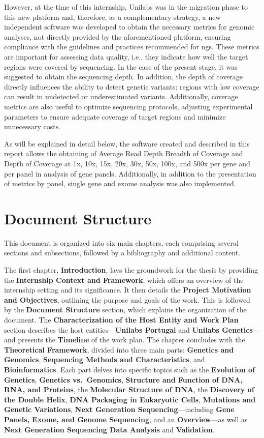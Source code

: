 However, at the time of this internship, Unilabs was in the migration phase to this new platform and, therefore, as a complementary strategy, a new independent software was developed to obtain the necessary metrics for genomic analyses, not directly provided by the aforementioned platform, ensuring compliance with the guidelines and practices recommended for \ac{ngs}. These metrics are important for assessing data quality, i.e., they indicate how well the target regions were covered by sequencing. In the case of the present stage, it was suggested to obtain the sequencing depth. In addition, the depth of coverage directly influences the ability to detect genetic variants: regions with low coverage can result in undetected or underestimated variants. Additionally, coverage metrics are also useful to optimize sequencing protocols, adjusting experimental parameters to ensure adequate coverage of target regions and minimize unnecessary costs. 

As will be explained in detail below, the software created and described in this report allows the obtaining of Average Read Depth Breadth of Coverage and Depth of Coverage at 1x, 10x, 15x, 20x, 30x, 50x, 100x, and 500x per gene and per panel in analysis of gene panels. Additionally, in addition to the presentation of metrics by panel, single gene and exome analysis was also implemented.

\section{Document Structure} \label{sec:doc_structure}

This document is organized into six main chapters, each comprising several sections and subsections, followed by a bibliography and additional content.

The first chapter, \textbf{Introduction}, lays the groundwork for the thesis by providing the \textbf{Internship Context and Framework}, which offers an overview of the internship setting and its significance. It then details the \textbf{Project Motivation and Objectives}, outlining the purpose and goals of the work. This is followed by the \textbf{Document Structure} section, which explains the organization of the document. The \textbf{Characterization of the Host Entity and Work Plan} section describes the host entities—\textbf{Unilabs Portugal} and \textbf{Unilabs Genetics}—and presents the \textbf{Timeline} of the work plan. The chapter concludes with the \textbf{Theoretical Framework}, divided into three main parts: \textbf{Genetics and Genomics}, \textbf{Sequencing Methods and Characteristics}, and \textbf{Bioinformatics}. Each part delves into specific topics such as the \textbf{Evolution of Genetics}, \textbf{Genetics vs.\ Genomics}, \textbf{Structure and Function of DNA, RNA, and Proteins}, the \textbf{Molecular Structure of DNA}, the \textbf{Discovery of the Double Helix}, \textbf{DNA Packaging in Eukaryotic Cells}, \textbf{Mutations and Genetic Variations}, \textbf{Next Generation Sequencing}—including \textbf{Gene Panels, Exome, and Genome Sequencing}, and an \textbf{Overview}—as well as \textbf{Next Generation Sequencing Data Analysis} and \textbf{Validation}.

